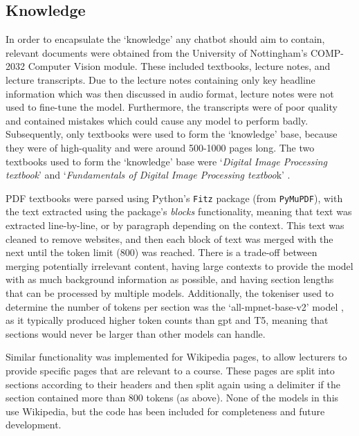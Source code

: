 \subsection{Knowledge}\label{sec:methodology_knowledge}
In order to encapsulate the `knowledge' any chatbot should aim to contain, relevant documents were obtained from the University of Nottingham's COMP-2032 Computer Vision module. These included textbooks, lecture notes, and lecture transcripts. Due to the lecture notes containing only key headline information which was then discussed in audio format, lecture notes were not used to fine-tune the model. Furthermore, the transcripts were of poor quality and contained mistakes which could cause any model to perform badly. Subsequently, only textbooks were used to form the `knowledge' base, because they were of high-quality and were around 500-1000 pages long. The two textbooks used to form the `knowledge' base were `\textit{Digital Image Processing textbook}' \citep{gonzalez2018digital} and `\textit{Fundamentals of Digital Image Processing textboo}k' \citep{solomon2010fundamentals}.

PDF textbooks were parsed using Python's \texttt{Fitz} package (from \texttt{PyMuPDF}), with the text extracted using the package's \textit{blocks} functionality, meaning that text was extracted line-by-line, or by paragraph depending on the context. This text was cleaned to remove websites, and then each block of text was merged with the next until the token limit (800) was reached. There is a trade-off between merging potentially irrelevant content, having large contexts to provide the model with as much background information as possible, and having section lengths that can be processed by multiple models. Additionally, the tokeniser used to determine the number of tokens per section was the `all-mpnet-base-v2' model \citep{huggingface_tokeniser_model}, as it typically produced higher token counts than \acrshort{gpt} and T5, meaning that sections would never be larger than other models can handle.

Similar functionality was implemented for Wikipedia pages, to allow lecturers to provide specific pages that are relevant to a course. These pages are split into sections according to their headers and then split again using a delimiter if the section contained more than 800 tokens (as above). None of the models in this \papertype use Wikipedia, but the code has been included for completeness and future development.


